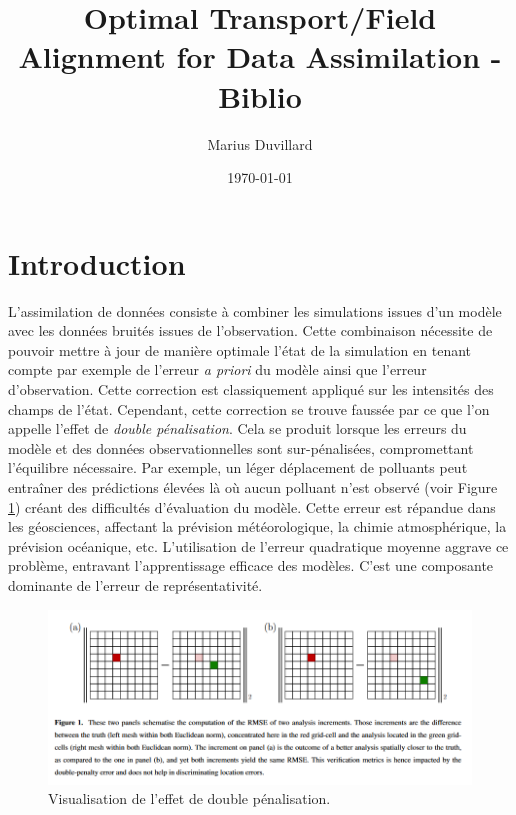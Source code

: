 \documentclass{article}
\begin{document}
\title{Optimal Transport/Field Alignment for Data Assimilation - Biblio}
\author{Marius Duvillard}
\date{\today}
\maketitle

\tableofcontents

\section{Introduction}

L'assimilation de données consiste à combiner les simulations issues d'un modèle avec les données bruités issues de l'observation. Cette combinaison nécessite de pouvoir mettre à jour de manière optimale l'état de la simulation en tenant compte par exemple de l'erreur \textit{a priori} du modèle ainsi que l'erreur d'observation.
Cette correction est classiquement appliqué sur les intensités des champs de l'état. Cependant, cette correction se trouve faussée par ce que l'on appelle l'effet de \textit{double pénalisation}.
Cela se produit lorsque les erreurs du modèle et des données observationnelles sont sur-pénalisées, compromettant l'équilibre nécessaire. Par exemple, un léger déplacement de polluants peut entraîner des prédictions élevées là où aucun polluant n'est observé (voir Figure \ref{fig:double_penalization_error}) créant des difficultés d'évaluation du modèle. Cette erreur est répandue dans les géosciences, affectant la prévision météorologique, la chimie atmosphérique, la prévision océanique, etc. L'utilisation de l'erreur quadratique moyenne aggrave ce problème, entravant l'apprentissage efficace des modèles. C'est une composante dominante de l'erreur de représentativité.

\begin{figure}[h]
    \centering
    \includegraphics[width=\linewidth]{double_penalization_error.png}
    \caption{Visualisation de l'effet de double pénalisation.}
    \label{fig:double_penalization_error}
\end{figure}
\end{document}
